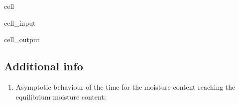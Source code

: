 \documentclass[letterpaper,10pt,english]{jupyterBook}
\begin{document}
\begin{sphinxuseclass}{cell}
\begin{sphinxVerbatimInput}
\begin{sphinxuseclass}{cell_input}
\end{sphinxuseclass}\end{sphinxVerbatimInput}
\begin{sphinxVerbatimOutput}

\begin{sphinxuseclass}{cell_output}
\noindent{}

\end{sphinxuseclass}\end{sphinxVerbatimOutput}

\end{sphinxuseclass}

\subsection{Additional info}
\label{\detokenize{Exercise_W10_2021:additional-info}}\begin{enumerate}
%
\item {} 
\sphinxAtStartPar
Asymptotic behaviour of the time for the moisture content reaching the equilibrium moisture content:

\end{enumerate}
\end{document}
